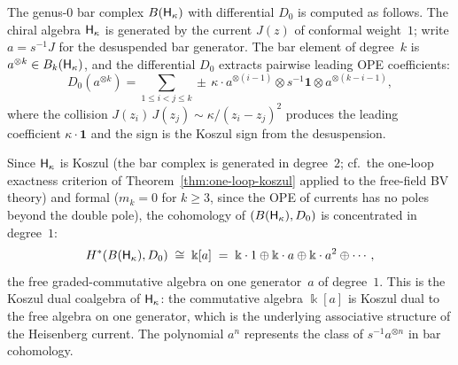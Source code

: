 \begin{computation}
\label{comp:heis-genus0-bar}
The genus-$0$ bar complex $B(\mathsf{H}_\kappa)$ with differential
$D_0$ is computed as follows. The chiral algebra $\mathsf{H}_\kappa$
is generated by the current $J(z)$ of conformal weight~$1$;
write $a = s^{-1}J$ for the desuspended bar generator.
The bar element of degree~$k$ is
$a^{\otimes k} \in B_k(\mathsf{H}_\kappa)$, and the
differential $D_0$ extracts pairwise leading OPE coefficients:
\[
 D_0(a^{\otimes k})
 = \sum_{1 \le i < j \le k}
 \pm\, \kappa \cdot
 a^{\otimes (i-1)} \otimes
 s^{-1}\mathbf{1} \otimes
 a^{\otimes (k-i-1)},
\]
where the collision $J(z_i)\, J(z_j) \sim \kappa/(z_i - z_j)^2$
produces the leading coefficient
$\kappa \cdot \mathbf{1}$ and the sign is the Koszul sign
from the desuspension.

Since $\mathsf{H}_\kappa$ is Koszul (the bar complex is generated
in degree~$2$; cf.\ the one-loop exactness criterion of
Theorem~\ref{thm:one-loop-koszul} applied to the free-field
BV theory) and formal ($m_k = 0$ for $k \ge 3$, since the OPE
of currents has no poles beyond the double pole), the
cohomology of $(B(\mathsf{H}_\kappa), D_0)$ is concentrated in
degree~$1$:
\begin{equation}\label{eq:heis-genus0-cohomology}
 H^\ast(B(\mathsf{H}_\kappa), D_0)
 \;\cong\; \Bbbk[a]
 \;=\; \Bbbk \cdot 1 \oplus \Bbbk \cdot a
 \oplus \Bbbk \cdot a^2 \oplus \cdots,
\end{equation}
the free graded-commutative algebra on one generator~$a$ of
degree~$1$. This is the Koszul dual coalgebra of $\mathsf{H}_\kappa$:
the commutative algebra $\Bbbk[a]$ is Koszul dual to the
free algebra on one generator, which is the underlying
associative structure of the Heisenberg current. The polynomial
$a^n$ represents the class of $s^{-1}a^{\otimes n}$ in bar
cohomology.
\end{computation}

